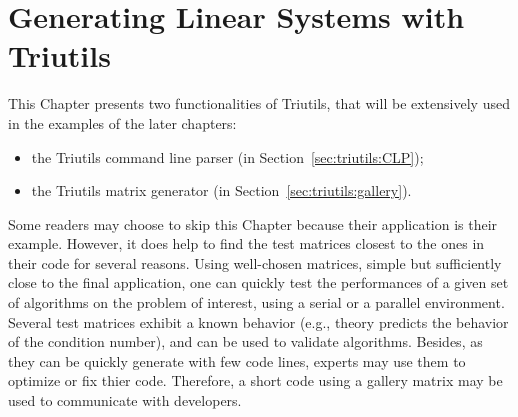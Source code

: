 % 
% 
% 
%  
%  
% 

\chapter{Generating Linear Systems with Triutils}
\label{chap:triutils}


\begin{introchapter}
This Chapter presents two functionalities of Triutils, that will be
extensively used in the examples of the later chapters: 
\begin{itemize}
\item the Triutils command line parser (in
  Section~\ref{sec:triutils:CLP});
\item the Triutils matrix generator (in Section~\ref{sec:triutils:gallery}).
\end{itemize}
Some readers may choose to skip this Chapter because their application
is their example. However, it does help to find the test matrices
closest to the ones in their code for several reasons.  Using
well-chosen matrices, simple but sufficiently close to the final
application, one can quickly test the performances of a given set of
algorithms on the problem of interest, using a serial or a parallel
environment. Several test matrices exhibit a known behavior (e.g.,
theory predicts the behavior of the condition number), and can be used
to validate algorithms. Besides, as they can be quickly generate with
few code lines, experts may use them to optimize or fix thier code.
Therefore, a short code using a gallery matrix may be used to
communicate with developers.
\end{introchapter}

